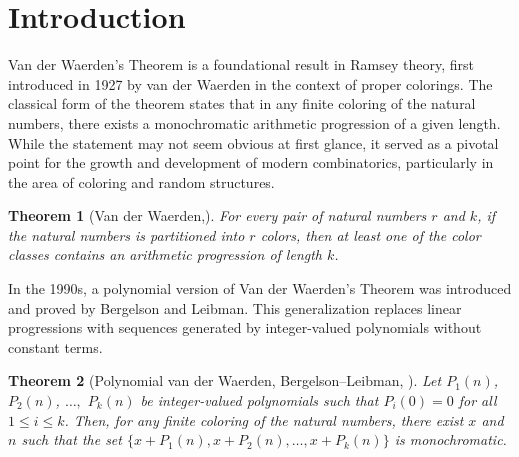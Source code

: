 \documentclass{amsart}
\newtheorem{theorem}{Theorem}[section]
\theoremstyle{definition}
\theoremstyle{remark}
\numberwithin{equation}{section}
\begin{document}




	\section{Introduction}
	
	Van der Waerden's Theorem is a foundational result in Ramsey theory, first introduced in 1927 by van der Waerden in the context of proper colorings. The classical form of the theorem states that in any finite coloring of the natural numbers, there exists a monochromatic arithmetic progression of a given length. While the statement may not seem obvious at first glance, it served as a pivotal point for the growth and development of modern combinatorics, particularly in the area of coloring and random structures.
	
	\begin{theorem}[Van der Waerden,\cite{vandw1927}]
		For every pair of natural numbers $r$ and $k$, if the natural numbers is partitioned into $r$ colors, then at least one of the color classes contains an arithmetic progression of length $k$.
	\end{theorem}
	
	In the 1990s, a polynomial version of Van der Waerden's Theorem was introduced and proved by Bergelson and Leibman. This generalization replaces linear progressions with sequences generated by integer-valued polynomials without constant terms.
	
	\begin{theorem}[Polynomial van der Waerden, Bergelson–Leibman, \cite{Bergelson1996}]		
	Let $P_1(n)$, $P_2(n)$, $\dots,$ $P_k(n)$ be integer-valued polynomials such that $P_i(0) = 0$ for all $1 \leq i \leq k$. Then, for any finite coloring of the natural numbers, there exist $x$ and $n$ such that the set $\{x + P_1(n), x + P_2(n), \dots, x + P_k(n)\}$ is monochromatic.
	\end{theorem}
	
\end{document}
